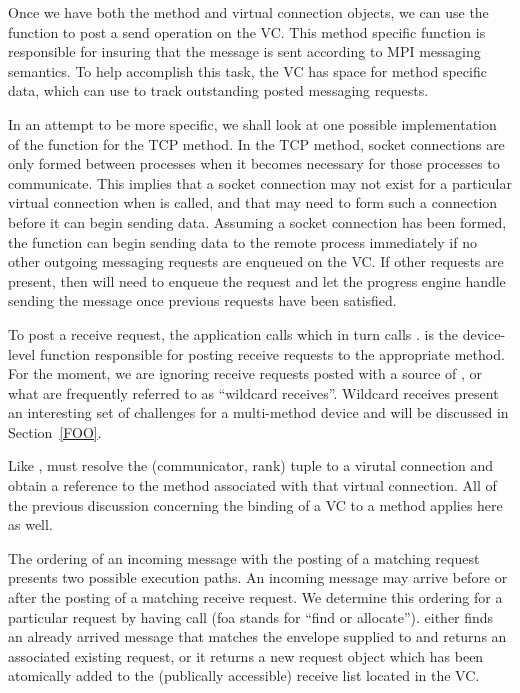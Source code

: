 Once we have both the method and virtual connection objects, we can use the
 function to post a send operation on the VC.  This
method specific function is responsible for insuring that the message is sent
according to MPI messaging semantics.  To help accomplish this task, the VC has
space for method specific data, which  can use to track
outstanding posted messaging requests.

In an attempt to be more specific, we shall look at one possible
implementation of the  function for the TCP method.  In the TCP
method, socket connections are only formed between processes when it becomes
necessary for those processes to communicate.  This implies that a socket
connection may not exist for a particular virtual connection when
 is called, and that  may need to form such a
connection before it can begin sending data.  Assuming a socket connection has
been formed, the  function can begin sending data to the remote
process immediately if no other outgoing messaging requests are enqueued on the
VC.  If other requests are present, then  will need to enqueue
the request and let the progress engine handle sending the message once
previous requests have been satisfied.

To post a receive request, the application calls  which in
turn calls .   is the device-level
function responsible for posting receive requests to the appropriate method.
For the moment, we are ignoring receive requests posted with a source of
, or what are frequently referred to as ``wildcard
receives''.  Wildcard receives present an interesting set of challenges for a
multi-method device and will be discussed in Section~\ref{FOO}.

Like ,  must resolve the (communicator, rank)
tuple to a virutal connection and obtain a reference to the method associated
with that virtual connection.  All of the previous discussion concerning the
binding of a VC to a method applies here as well.

The ordering of an incoming message with the posting of a matching request
presents two possible execution paths.  An incoming message may arrive before
or after the posting of a matching receive request.  We determine this ordering
for a particular request by having  call
 (foa stands for ``find or allocate'').
 either finds an already arrived message that matches
the envelope supplied to  and returns an associated existing
request, or it returns a new request object which has been atomically added to
the (publically accessible) receive list located in the VC.

